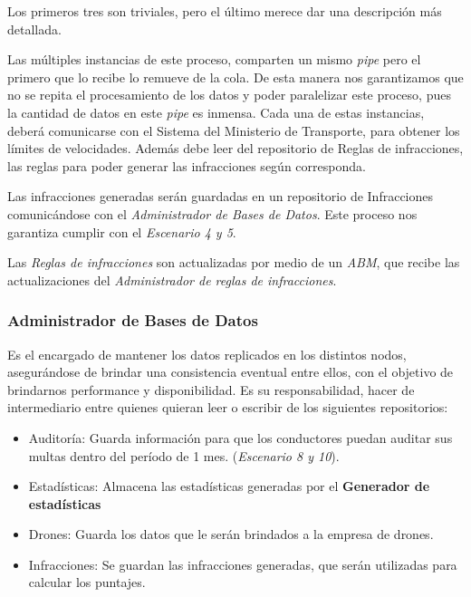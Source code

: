 Los primeros tres son triviales, pero el último merece dar una descripción más 
detallada.

Las múltiples instancias de este proceso, comparten un mismo \textit{pipe} pero 
el primero que lo recibe lo remueve de la cola. De esta manera nos garantizamos 
que no se repita el procesamiento de los datos y poder paralelizar este 
proceso, pues la cantidad de datos en este \textit{pipe} es inmensa.
Cada una de estas instancias, deberá comunicarse con el Sistema del Ministerio 
de Transporte, para obtener los límites de velocidades. Además debe leer del 
repositorio de Reglas de infracciones, las reglas para poder generar las 
infracciones según corresponda.

Las infracciones generadas serán guardadas en un repositorio de Infracciones 
comunicándose con el \textit{Administrador de Bases de Datos}.
Este proceso nos garantiza cumplir con el \textit{Escenario 4 y 5}.

Las \textit{Reglas de infracciones} son actualizadas por medio de un 
\textit{ABM}, que recibe las actualizaciones del \textit{Administrador de reglas de 
infracciones}.


\subsubsection{Administrador de Bases de Datos}
Es el encargado de mantener los datos replicados en los distintos nodos, 
asegurándose de brindar una consistencia eventual entre ellos, con el objetivo 
de brindarnos performance y disponibilidad.
Es su responsabilidad, hacer de intermediario entre quienes quieran leer o 
escribir de los siguientes repositorios:

\begin{itemize}
  \item Auditoría: Guarda información para que los conductores puedan auditar
  sus multas dentro del período de 1 mes. (\textit{Escenario 8 y 10}).
  \item Estadísticas: Almacena las estadísticas generadas por el \textbf{Generador de estadísticas}
  \item Drones: Guarda los datos que le serán brindados a la empresa de drones.
  \item Infracciones: Se guardan las infracciones generadas, que serán utilizadas
  para calcular los puntajes.
\end{itemize}


